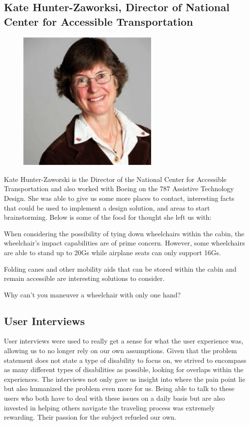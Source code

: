 \documentclass[a4paper, 12pt,conference]{new_cit_thesis}
\begin{document}
\subsection{Kate Hunter-Zaworksi, Director of National Center for Accessible Transportation}
\begin{figure}[h]
  \centering
     \includegraphics[width=7cm]{images/image021}
  \label{fig:21}
\end{figure}
Kate Hunter-Zaworski is the Director of the National Center for Accessible Transportation and also worked with Boeing on the 787 Assistive Technology Design.  She was able to give us some more places to contact, interesting facts that could be used to implement a design solution, and areas to start brainstorming.  Below is some of the food for thought she left us with:

\begin{list}{-}{}
  \item When considering the possibility of tying down wheelchairs within the cabin, the wheelchair’s impact capabilities are of prime concern. However, some wheelchairs are able to stand up to 20Gs while airplane seats can only support 16Gs.
  \item Folding canes and other mobility aids that can be stored within the cabin and remain accessible are interesting solutions to consider. 
  \item Why can’t you maneuver a wheelchair with only one hand?
\end{list}

\subsection{User Interviews}
User interviews were used to really get a sense for what the user experience was, allowing us to no longer rely on our own assumptions. Given that the problem statement does not state a type of disability to focus on, we strived to encompass as many different types of disabilities as possible, looking for overlaps within the experiences. The interviews not only gave us insight into where the pain point lie but also humanized the problem even more for us. Being able to talk to these users who both have to deal with these issues on a daily basis but are also invested in helping others navigate the traveling process was extremely rewarding. Their passion for the subject refueled our own. 
\end{document}
